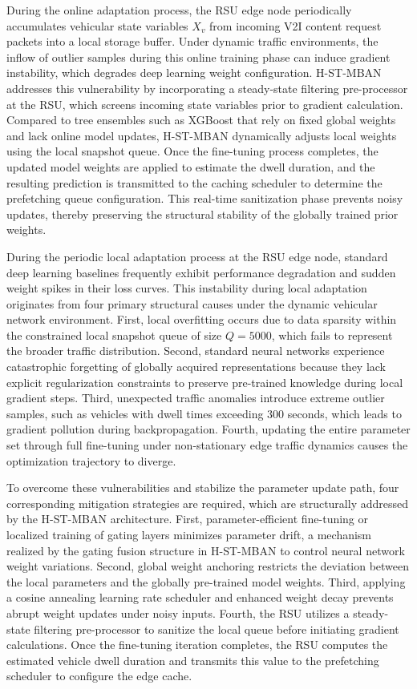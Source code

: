 \documentclass[journal]{IEEEtran}
\begin{document}
During the online adaptation process, the RSU edge node periodically accumulates vehicular state variables $X_v$ from incoming V2I content request packets into a local storage buffer. Under dynamic traffic environments, the inflow of outlier samples during this online training phase can induce gradient instability, which degrades deep learning weight configuration. H-ST-MBAN addresses this vulnerability by incorporating a steady-state filtering pre-processor at the RSU, which screens incoming state variables prior to gradient calculation. Compared to tree ensembles such as XGBoost that rely on fixed global weights and lack online model updates, H-ST-MBAN dynamically adjusts local weights using the local snapshot queue. Once the fine-tuning process completes, the updated model weights are applied to estimate the dwell duration, and the resulting prediction is transmitted to the caching scheduler to determine the prefetching queue configuration. This real-time sanitization phase prevents noisy updates, thereby preserving the structural stability of the globally trained prior weights.

During the periodic local adaptation process at the RSU edge node, standard deep learning baselines frequently exhibit performance degradation and sudden weight spikes in their loss curves. This instability during local adaptation originates from four primary structural causes under the dynamic vehicular network environment. First, local overfitting occurs due to data sparsity within the constrained local snapshot queue of size $Q=5000$, which fails to represent the broader traffic distribution. Second, standard neural networks experience catastrophic forgetting of globally acquired representations because they lack explicit regularization constraints to preserve pre-trained knowledge during local gradient steps. Third, unexpected traffic anomalies introduce extreme outlier samples, such as vehicles with dwell times exceeding 300 seconds, which leads to gradient pollution during backpropagation. Fourth, updating the entire parameter set through full fine-tuning under non-stationary edge traffic dynamics causes the optimization trajectory to diverge.

To overcome these vulnerabilities and stabilize the parameter update path, four corresponding mitigation strategies are required, which are structurally addressed by the H-ST-MBAN architecture. First, parameter-efficient fine-tuning or localized training of gating layers minimizes parameter drift, a mechanism realized by the gating fusion structure in H-ST-MBAN to control neural network weight variations. Second, global weight anchoring restricts the deviation between the local parameters and the globally pre-trained model weights. Third, applying a cosine annealing learning rate scheduler and enhanced weight decay prevents abrupt weight updates under noisy inputs. Fourth, the RSU utilizes a steady-state filtering pre-processor to sanitize the local queue before initiating gradient calculations. Once the fine-tuning iteration completes, the RSU computes the estimated vehicle dwell duration and transmits this value to the prefetching scheduler to configure the edge cache.
\end{document}
